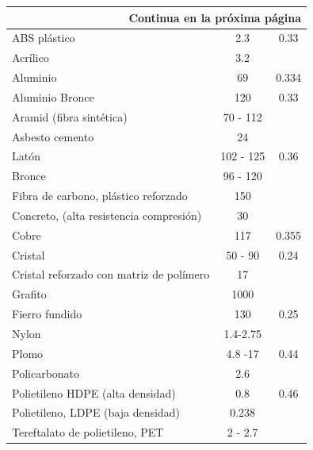 \documentclass[letterpaper]{report}
\begin{document}
\begin{table}[]
\begin{center}
\begin{longtable}{|l|c|c|}
	\hline \multicolumn{3}{|r|}{{Continua en la próxima página}} \\ \hline
	\endfoot
		ABS plástico                             & 2.3       & 0.33  \\
		Acrílico                                 & 3.2       &       \\
		Aluminio                                 & 69        & 0.334 \\
		Aluminio Bronce                          & 120       & 0.33  \\
		Aramid (fibra sintética)                 & 70 - 112  &       \\
		Asbesto cemento                          & 24        &       \\
		Latón                                    & 102 - 125 & 0.36  \\
		Bronce                                   & 96 - 120  &       \\
		Fibra de carbono, plástico reforzado     & 150       &       \\
		Concreto, (alta resistencia compresión)  & 30        &       \\
		Cobre                                    & 117       & 0.355 \\
		Cristal                                  & 50 - 90   & 0.24  \\
		Cristal reforzado con matriz de polímero & 17        &       \\
		Grafito                                  & 1000      &       \\
		Fierro fundido                           & 130       & 0.25  \\
		Nylon                                    & 1.4-2.75  &       \\
		Plomo                                    & 4.8 -17   & 0.44  \\
		Policarbonato                            & 2.6       &       \\
		Polietileno HDPE (alta densidad)         & 0.8       & 0.46  \\
		Polietileno, LDPE (baja densidad)        & 0.238     &       \\
		Tereftalato de polietileno, PET          & 2 - 2.7   &       \\

\end{longtable}
\end{center}
\end{table}
\end{document}
